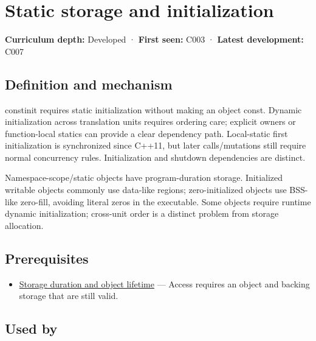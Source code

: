 \hypertarget{appendix-17c93c4c2f19}{}\label{referencestart:appendix-17c93c4c2f19}
\section{Static storage and initialization}\label{appendix-17c93c4c2f19-static-storage-and-initialization}

\textbf{Curriculum depth:} Developed · \textbf{First seen:} C003 · \textbf{Latest development:} C007

\begin{allmightroledefinition}

\subsection{Definition and mechanism}\label{appendix-17c93c4c2f19-definition-and-mechanism}

constinit requires static initialization without making an object const. Dynamic initialization across translation units requires ordering care; explicit owners or function-local statics can provide a clear dependency path. Local-static first initialization is synchronized since C++11, but later calls/mutations still require normal concurrency rules. Initialization and shutdown dependencies are distinct.

\end{allmightroledefinition}

Namespace-scope/static objects have program-duration storage. Initialized writable objects commonly use data-like regions; zero-initialized objects use BSS-like zero-fill, avoiding literal zeros in the executable. Some objects require runtime dynamic initialization; cross-unit order is a distinct problem from storage allocation.

\subsection{Prerequisites}\label{appendix-17c93c4c2f19-prerequisites}

\begin{itemize}
\tightlist
\item
  \hyperref[appendix-0b104bcba06b]{Storage duration and object lifetime} --- Access requires an object and backing storage that are still valid.
\end{itemize}

\subsection{Used by}\label{appendix-17c93c4c2f19-used-by}

